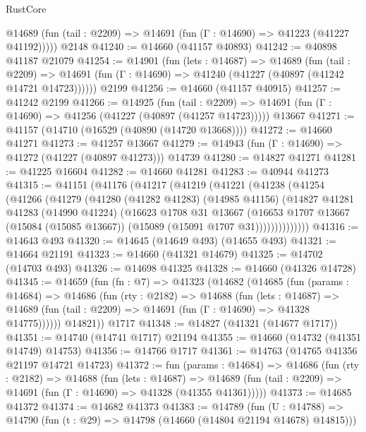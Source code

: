 \begin{lexlean}{RustCore}
\begin{coremodule}
      @14689 (fun (tail : @2209) => @14691 (fun (Γ : @14690) => @41223 (@41227 @41192)))))
    @2148
@41240 := @14660 (@41157 @40893)
@41242 := @40898 @41187 @21079
@41254 := @14901
    (fun (lets : @14687) =>
    @14689
      (fun (tail : @2209) =>
      @14691 (fun (Γ : @14690) => @41240 (@41227 (@40897 (@41242 @14721 @14723))))))
    @2199
@41256 := @14660 (@41157 @40915)
@41257 := @41242 @2199
@41266 := @14925
    (fun (tail : @2209) => @14691 (fun (Γ : @14690) => @41256 (@41227 (@40897 (@41257 @14723)))))
    @13667
@41271 := @41157 (@14710 (@16529 (@40890 (@14720 @13668))))
@41272 := @14660 @41271
@41273 := @41257 @13667
@41279 := @14943 (fun (Γ : @14690) => @41272 (@41227 (@40897 @41273))) @14739
@41280 := @14827 @41271
@41281 := @41225 @16604
@41282 := @14660 @41281
@41283 := @40944 @41273
@41315 := @41151
    (@41176
      (@41217
        (@41219
          (@41221
            (@41238
              (@41254
                (@41266
                  (@41279
                    (@41280
                      (@41282 @41283)
                      (@14985 @41156)
                      (@14827
                        @41281
                        @41283
                        (@14990 @41224)
                        (@16623
                          @1708
                          @31
                          @13667
                          (@16653
                            @1707
                            @13667
                            (@15084 (@15085 @13667))
                            (@15089 (@15091 @1707 @31))))))))))))))
@41316 := @14643 @493
@41320 := @14645 (@14649 @493) (@14655 @493)
@41321 := @14664 @21191
@41323 := @14660 (@41321 @14679)
@41325 := @14702 (@14703 @493)
@41326 := @14698 @41325
@41328 := @14660 (@41326 @14728)
@41345 := @14659
    (fun (fn : @7) =>
    @41323
      (@14682
        (@14685
          (fun (params : @14684) =>
          @14686
            (fun (rty : @2182) =>
            @14688
              (fun (lets : @14687) =>
              @14689 (fun (tail : @2209) => @14691 (fun (Γ : @14690) => @41328 @14775))))))
        @14821))
    @1717
@41348 := @14827 (@41321 (@14677 @1717))
@41351 := @14740 (@14741 @1717) @21194
@41355 := @14660 (@14732 (@41351 @14749) @14753)
@41356 := @14766 @1717
@41361 := @14763 (@14765 @41356 @21197 @14721 @14723)
@41372 := fun (params : @14684) =>
  @14686
    (fun (rty : @2182) =>
    @14688
      (fun (lets : @14687) =>
      @14689 (fun (tail : @2209) => @14691 (fun (Γ : @14690) => @41328 (@41355 @41361)))))
@41373 := @14685 @41372
@41374 := @14682 @41373
@41383 := @14789
    (fun (U : @14788) => @14790 (fun (t : @29) => @14798 (@14660 (@14804 @21194 @14678) @14815)))

\end{coremodule}
\end{lexlean}
